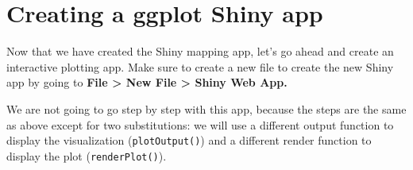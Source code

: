 \documentclass[
  krantz2]{krantz}
\begin{document}
\hypertarget{creating-a-ggplot-shiny-app}{%
\section{Creating a ggplot Shiny app}\label{creating-a-ggplot-shiny-app}}

Now that we have created the Shiny mapping app, let's go ahead and create an interactive plotting app. Make sure to create a new file to create the new Shiny app by going to \textbf{File \textgreater{} New File \textgreater{} Shiny Web App.}

We are not going to go step by step with this app, because the steps are the same as above except for two substitutions: we will use a different output function to display the visualization (\texttt{plotOutput()}) and a different render function to display the plot (\texttt{renderPlot()}).
\end{document}
